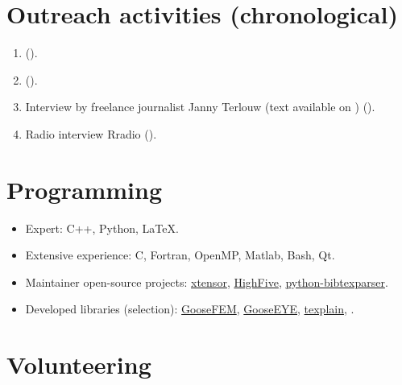 \documentclass[
    bibsize = normalsize,
    bibpackage = none,
    paragraphshape = display,
    paragraphafter = none,
]{goose-article}
\begin{document}
\section*{Outreach activities (chronological)}

\begin{enumerate}
    \itemsep0em
    \item {} (\MyDateInterviewHorizons).
    \item {} (\MyDateInterviewRTS).
    \item Interview by freelance journalist Janny Terlouw (text available on ) (\MyDateInterviewTerlouw).
    \item Radio interview Rradio (\MyDateInterviewRradio).
\end{enumerate}

\section*{Programming}

\begin{itemize}
    \itemsep0em
    \item Expert: C++, Python, LaTeX.
    \item Extensive experience: C, Fortran, OpenMP, Matlab, Bash, Qt.
    \item Maintainer open-source projects: \href{https://github.com/xtensor-stack/xtensor}{xtensor}, \href{https://github.com/bluebrain/HighFive}{HighFive}, \href{https://github.com/sciunto-org/python-bibtexparser}{python-bibtexparser}.
    \item Developed libraries (selection): \href{https://github.com/tdegeus/GooseFEM}{GooseFEM}, \href{https://github.com/tdegeus/GooseEYE}{GooseEYE}, \href{https://github.com/tdegeus/texplain}{texplain}, \MySourceGitHub{\dots}.
\end{itemize}

\section*{Volunteering}
\end{document}
